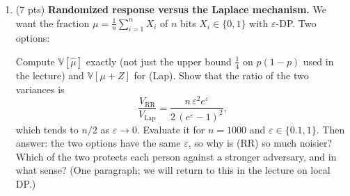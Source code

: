 \documentclass[11pt]{article}
\newcommand{\V}{\mathbb{V}}
\newcommand{\Lap}{\mathrm{Lap}}
\newcommand{\FPR}{\mathrm{FPR}}
\newcommand{\TPR}{\mathrm{TPR}}
\newcommand{\eps}{\varepsilon}
\newenvironment{answer}{\par\medskip\noindent\textbf{Answer.}\ }{\par\bigskip}
\begin{document}
\begin{enumerate}
\begin{enumerate}
\begin{answer}
Thus, the attacker predicts $H_1$ when
$Y=1$ and $H_0$ when $Y=0$.

\end{answer}

\item Compute the $(\FPR,\TPR)$ of the test ``output 1 if and only if
$Y=1$'', and show that it satisfies the first inequality of
\eqref{eq:privacy-region} with equality (with $\delta=0$). What does this
say about the tightness of the DP bound for randomized response?

\begin{answer}

For the test that outputs $1$ if and only if
$Y=1$, the false positive rate is

\[
\FPR
=\Pr(Y=1\mid H_0)
=1-p
=\frac{1}{1+e^\eps}.
\]

The true positive rate is

\[
\TPR
=\Pr(Y=1\mid H_1)
=p
=\frac{e^\eps}{1+e^\eps}.
\]

Therefore,

\[
e^\eps\FPR
=e^\eps\frac{1}{1+e^\eps}
=\frac{e^\eps}{1+e^\eps}
=\TPR.
\]

Thus,

\[
\boxed{\TPR=e^\eps\FPR}.
\]

The first privacy-region inequality holds
with equality when $\delta=0$.
This shows that the DP bound is tight for
randomized response: an attacker can achieve
the maximum TPR allowed by the bound at
this FPR, so the bound cannot be improved
in general.

\end{answer}
\end{enumerate}

\item (7 pts) \textbf{Randomized response versus the Laplace mechanism.} We
want the fraction $\mu=\frac{1}{n}\sum_{i=1}^n X_i$ of $n$ bits
$X_i\in\{0,1\}$ with $\eps$-DP. Two options:
Compute $\V[\hat\mu]$ exactly (not just the upper bound $\frac14$ on $p(1-p)$
used in the lecture) and $\V[\mu+Z]$ for (Lap). Show that the ratio of the two
variances is
\[
  \frac{V_{\mathrm{RR}}}{V_{\mathrm{Lap}}}
  =\frac{n\,\eps^2 e^{\eps}}{2\,(e^{\eps}-1)^2},
\]
which tends to $n/2$ as $\eps\to0$. Evaluate it for $n=1000$ and
$\eps\in\{0.1,1\}$. Then answer: the two options have the same $\eps$, so why
is (RR) so much noisier? Which of the two protects each person against a
stronger adversary, and in what sense? (One paragraph; we will return to this
in the lecture on local DP.)


\end{enumerate}
\end{document}
